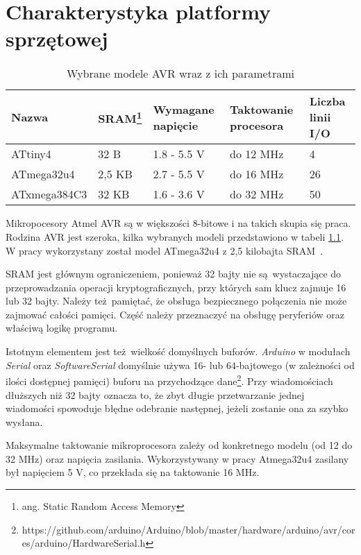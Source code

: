 \chapter{Charakterystyka platformy sprzętowej}
\label{cha:hardware}

\begin{table}[h]
\centering
\caption{Wybrane modele AVR wraz z ich parametrami}
\begin{tabular}{|l|l|l|l|l|}
    \hline
    \textbf{Nazwa}  &
    \textbf{SRAM\footnote{ang. Static Random Access Memory}}  &
    \textbf{Wymagane napięcie}  &
    \textbf{Taktowanie procesora}  &
    \textbf{Liczba linii I/O} \\
    \hline
    ATtiny4 \cite{Attiny4}& 32 B & 1.8 - 5.5 V & do 12 MHz & 4\\
    \hline
    ATmega32u4 \cite{Atmega32} & 2,5 KB & 2.7 - 5.5 V & do 16 MHz & 26\\
    \hline
    ATxmega384C3 \cite{Atxmega384} & 32 KB & 1.6 - 3.6 V & do 32 MHz & 50\\
    \hline
\end{tabular}
\label{tab:avrmodels}
\end{table}

Mikropocesory Atmel AVR są w większości 8-bitowe i na takich skupia się praca. Rodzina AVR jest szeroka, kilka wybranych modeli przedstawiono w tabeli \ref{tab:avrmodels}. W pracy wykorzystany został model ATmega32u4 z 2,5 kilobajta SRAM~\cite{Atmega32}.

SRAM jest głównym ograniczeniem, ponieważ 32 bajty nie są wystaczające do przeprowadzania operacji kryptograficznych, przy których sam klucz zajmuje 16 lub 32 bajty. Należy też pamiętać, że obsługa bezpiecznego połączenia nie może zajmować całości pamięci. Część należy przeznaczyć na obsługę peryferiów oraz właściwą logikę programu.

Istotnym elementem jest też wielkość domyślnych buforów. \emph{Arduino} w modułach \emph{Serial} oraz \emph{SoftwareSerial} domyślnie używa 16- lub 64-bajtowego (w zależności od ilości dostępnej pamięci) buforu na przychodzące dane\footnote{https://github.com/arduino/Arduino/blob/master/hardware/arduino/avr/cores/arduino/HardwareSerial.h}. Przy wiadomościach dłuższych niż 32 bajty oznacza to, że zbyt długie przetwarzanie jednej wiadomości spowoduje błędne odebranie następnej, jeżeli zostanie ona za szybko wysłana.

Maksymalne taktowanie mikroprocesora zależy od konkretnego modelu (od 12 do 32 MHz) oraz napięcia zasilania. Wykorzystywany w pracy Atmega32u4 zasilany był napięciem 5 V, co przekłada się na taktowanie 16 MHz.
